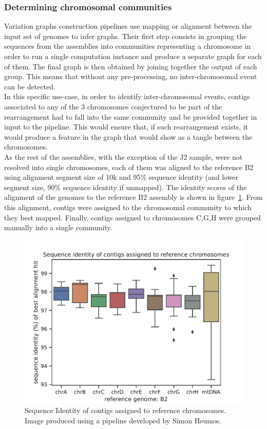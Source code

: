 \subsubsection{Determining chromosomal communities}
Variation graphs construction pipelines use mapping or alignment between the input set of genomes to infer graphs. Their first step consists in grouping the sequences from the assemblies into communities representing a chromosome in order to run a single computation instance and produce a separate graph for each of them. The final graph is then obtained by joining together the output of each group. This means that without any pre-processing, no inter-chromosomal event can be detected.\\ 
In this specific use-case, in order to identify inter-chromosomal events, contigs associated to any of the 3 chromosomes conjectured to be part of the rearrangement had to fall into the same community and be provided together in input to the pipeline. This would ensure that, if such rearrangement exists, it would produce a feature in the graph that would show as a tangle between the chromosomes.\\
As the rest of the assemblies, with the exception of the J2 sample, were not resolved into single chromosomes, each of them was aligned to the reference B2 using \wfmash alignment segment size of 10k and 95\% sequence identity (and lower segment size, 90\% sequence identity if unmapped). The identity scores of the alignment of the genomes to the reference B2 assembly is shown in figure~\ref{fig:lodelo_alignment_scores}. From this alignment, contigs were assigned to the chromosomal community to which they best mapped. Finally, contigs assigned to chromosomes C,G,H were grouped manually into a single community.
\begin{figure}[h!]
	\centering
	\includegraphics[width=.8\linewidth]{figures/lodelo/Alignment_scores.pdf}
	\caption[Sequence Identity of \lodelo samples's contigs assigned to reference chromosomes.]{Sequence Identity of contigs assigned to reference chromosomes. Image produced using a pipeline developed by Simon Heumos.}
	\label{fig:lodelo_alignment_scores}
\end{figure}

